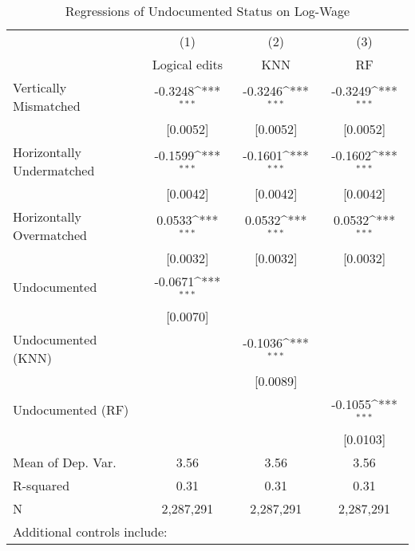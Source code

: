 \begin{table}[htbp]\centering
\def\sym#1{\ifmmode^{#1}\else\(^{#1}\)\fi}
\caption{Regressions of Undocumented Status on Log-Wage}
\begin{tabular}{l*{3}{c}}
\toprule
                    &\multicolumn{1}{c}{(1)}         &\multicolumn{1}{c}{(2)}         &\multicolumn{1}{c}{(3)}         \\
                    &Logical edits         &         KNN         &          RF         \\
\midrule
Vertically Mismatched&     -0.3248\sym{***}&     -0.3246\sym{***}&     -0.3249\sym{***}\\
                    &    [0.0052]         &    [0.0052]         &    [0.0052]         \\
\addlinespace
Horizontally Undermatched&     -0.1599\sym{***}&     -0.1601\sym{***}&     -0.1602\sym{***}\\
                    &    [0.0042]         &    [0.0042]         &    [0.0042]         \\
\addlinespace
Horizontally Overmatched&      0.0533\sym{***}&      0.0532\sym{***}&      0.0532\sym{***}\\
                    &    [0.0032]         &    [0.0032]         &    [0.0032]         \\
\addlinespace
Undocumented        &     -0.0671\sym{***}&                     &                     \\
                    &    [0.0070]         &                     &                     \\
\addlinespace
Undocumented (KNN)  &                     &     -0.1036\sym{***}&                     \\
                    &                     &    [0.0089]         &                     \\
\addlinespace
Undocumented (RF)   &                     &                     &     -0.1055\sym{***}\\
                    &                     &                     &    [0.0103]         \\
\midrule
Mean of Dep. Var.   &        3.56         &        3.56         &        3.56         \\
R-squared           &        0.31         &        0.31         &        0.31         \\
N                   &   2,287,291         &   2,287,291         &   2,287,291         \\
\bottomrule
\multicolumn{4}{l}{\footnotesize Additional controls include:}\\

\end{tabular}
\end{table}
